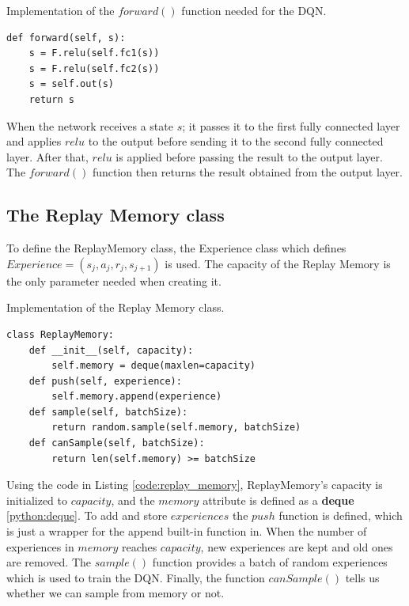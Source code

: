 \documentclass[12pt,oneside]{article}
\begin{document}
\begin{listing}[htbp]
\caption{Implementation of the $forward()$ function needed for the DQN.}
\label{code:nn_class_2}
\begin{verbatim}
def forward(self, s):
    s = F.relu(self.fc1(s))
    s = F.relu(self.fc2(s))
    s = self.out(s)
    return s
\end{verbatim}
\end{listing} 
When the network receives a state $s$; it passes it to the first fully connected layer and applies $relu$ to the output before sending it to the second fully connected layer. After that, $relu$ is applied before passing the result to the output layer. The $forward()$ function then returns the result obtained from the output layer.

\subsection{The Replay Memory class}
To define the ReplayMemory class, the Experience class which defines $Experience=(s_j, a_j, r_j, s_{j+1})$ is used. The capacity of the Replay Memory is the only parameter needed when creating it.
\begin{listing}[htbp]
\caption{Implementation of the Replay Memory class.}
\label{code:replay_memory}
\begin{verbatim}
class ReplayMemory:
    def __init__(self, capacity):
        self.memory = deque(maxlen=capacity)
    def push(self, experience):
        self.memory.append(experience)
    def sample(self, batchSize):
        return random.sample(self.memory, batchSize)
    def canSample(self, batchSize):
        return len(self.memory) >= batchSize
\end{verbatim}
\end{listing} 

Using the code in Listing \ref{code:replay_memory}, ReplayMemory's capacity is initialized to $capacity$, and the $memory$ attribute is defined as a \textbf{deque} \ref{python:deque}. To add and store $experiences$ the $push$ function is defined, which is just a wrapper for the append built-in function in. When the number of experiences in $memory$ reaches $capacity$, new experiences are kept and old ones are removed. The $sample()$ function provides a batch of random experiences which is used to train the DQN. Finally, the function $canSample()$ tells us whether we can sample from memory or not.
\end{document}
